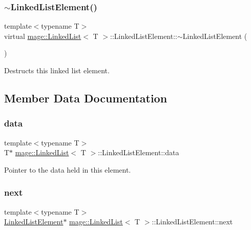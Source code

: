 \subsubsection{\texorpdfstring{$\sim$\+Linked\+List\+Element()}{~LinkedListElement()}}
{\footnotesize\ttfamily template$<$typename T$>$ \\
virtual \hyperlink{classmage_1_1_linked_list}{mage\+::\+Linked\+List}$<$ T $>$\+::Linked\+List\+Element\+::$\sim$\+Linked\+List\+Element (\begin{DoxyParamCaption}{ }\end{DoxyParamCaption})\hspace{0.3cm}{\ttfamily [virtual]}}

Destructs this linked list element. 

\subsection{Member Data Documentation}
\hypertarget{structmage_1_1_linked_list_1_1_linked_list_element_a7db014fd56a2bffd6dab7f52f1b30687}{}\label{structmage_1_1_linked_list_1_1_linked_list_element_a7db014fd56a2bffd6dab7f52f1b30687} 
\subsubsection{\texorpdfstring{data}{data}}
{\footnotesize\ttfamily template$<$typename T$>$ \\
T$\ast$ \hyperlink{classmage_1_1_linked_list}{mage\+::\+Linked\+List}$<$ T $>$\+::Linked\+List\+Element\+::data}

Pointer to the data held in this element. \hypertarget{structmage_1_1_linked_list_1_1_linked_list_element_a379ce1f54d7a044cdfd97595460ac602}{}\label{structmage_1_1_linked_list_1_1_linked_list_element_a379ce1f54d7a044cdfd97595460ac602} 
\subsubsection{\texorpdfstring{next}{next}}
{\footnotesize\ttfamily template$<$typename T$>$ \\
\hyperlink{structmage_1_1_linked_list_1_1_linked_list_element}{Linked\+List\+Element}$\ast$ \hyperlink{classmage_1_1_linked_list}{mage\+::\+Linked\+List}$<$ T $>$\+::Linked\+List\+Element\+::next}

